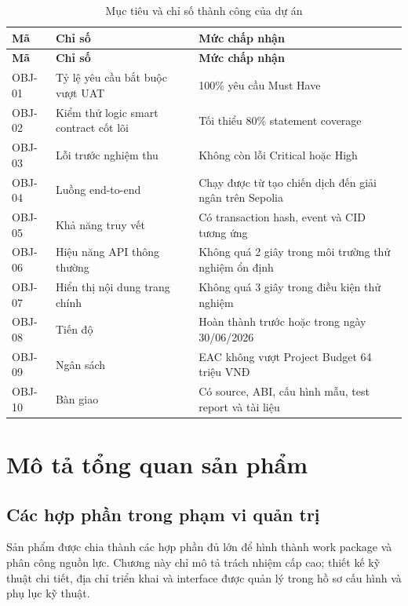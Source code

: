\begin{longtable}{| p{1.4cm} | p{7.2cm} | p{5.2cm} |}
\caption{Mục tiêu và chỉ số thành công của dự án}\label{tab:success-metrics}\\
\hline
\textbf{Mã} & \textbf{Chỉ số} & \textbf{Mức chấp nhận} \\
\hline
\endfirsthead
\hline
\textbf{Mã} & \textbf{Chỉ số} & \textbf{Mức chấp nhận} \\
\hline
\endhead
OBJ-01 & Tỷ lệ yêu cầu bắt buộc vượt UAT & 100\% yêu cầu Must Have \\ \hline
OBJ-02 & Kiểm thử logic smart contract cốt lõi & Tối thiểu 80\% statement coverage \\ \hline
OBJ-03 & Lỗi trước nghiệm thu & Không còn lỗi Critical hoặc High \\ \hline
OBJ-04 & Luồng end-to-end & Chạy được từ tạo chiến dịch đến giải ngân trên Sepolia \\ \hline
OBJ-05 & Khả năng truy vết & Có transaction hash, event và CID tương ứng \\ \hline
OBJ-06 & Hiệu năng API thông thường & Không quá 2 giây trong môi trường thử nghiệm ổn định \\ \hline
OBJ-07 & Hiển thị nội dung trang chính & Không quá 3 giây trong điều kiện thử nghiệm \\ \hline
OBJ-08 & Tiến độ & Hoàn thành trước hoặc trong ngày 30/06/2026 \\ \hline
OBJ-09 & Ngân sách & EAC không vượt Project Budget 64 triệu VNĐ \\ \hline
OBJ-10 & Bàn giao & Có source, ABI, cấu hình mẫu, test report và tài liệu \\
\hline
\end{longtable}

\section{Mô tả tổng quan sản phẩm}

\subsection{Các hợp phần trong phạm vi quản trị}

Sản phẩm được chia thành các hợp phần đủ lớn để hình thành work package và phân công nguồn lực. Chương này chỉ mô tả trách nhiệm cấp cao; thiết kế kỹ thuật chi tiết, địa chỉ triển khai và interface được quản lý trong hồ sơ cấu hình và phụ lục kỹ thuật.

